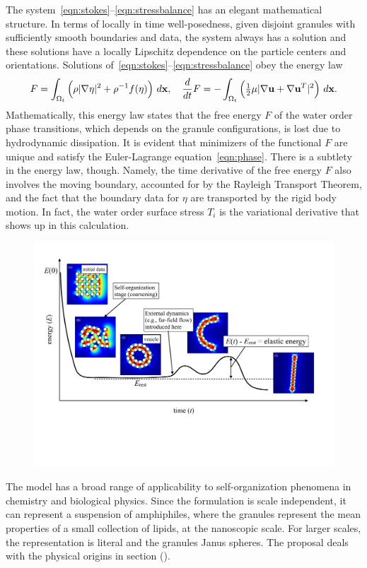 The system~\eqref{eqn:stokes}--\eqref{eqn:stressbalance} has an elegant
mathematical structure. In terms of locally in time well-posedness,
given disjoint granules with sufficiently smooth boundaries and data, the
system always has a solution and these solutions have a locally
Lipschitz dependence on the particle centers and orientations.
Solutions of~\eqref{eqn:stokes}--\eqref{eqn:stressbalance} obey the
energy law
\begin{align}
  F = \int_{\Omega_t}
  \left(\rho |\nabla \eta|^2 + \rho^{-1} f(\eta)\right) \,d\mathbf{x},
  \quad
  \frac{d}{dt}F
  = - \int_{\Omega_t} \left(\tfrac{1}{2}\mu|\nabla \mathbf{u} + \nabla
  \mathbf{u}^T|^2\right) \,d\mathbf{x}.
\end{align}
Mathematically, this energy law states that the free energy $F$ of the
water order phase transitions, which depends on the granule
configurations, is lost due to hydrodynamic dissipation. It is evident
that minimizers of the functional $F$ are unique and satisfy the
Euler-Lagrange equation~\eqref{eqn:phase}. There is a subtlety in the
energy law, though. Namely, the time derivative of the free energy $F$
also involves the moving boundary, accounted for by the Rayleigh
Transport Theorem, and the fact that the boundary data for $\eta$ are
transported by the rigid body motion. In fact, the water order surface
stress $T_i$ is the variational derivative that shows up in this
calculation.

\begin{figure}[t!]
\begin{center}
\includegraphics[width=\textwidth]{figures/Background/coarsening.pdf}
\end{center}
\caption{\label{fig:coarsening}}
\end{figure}
The model has a broad range of applicability to self-organization
phenomena in chemistry and biological physics. Since the formulation is
scale independent, it can represent a suspension of amphiphiles, where
the granules represent the mean properties of a small collection of
lipids, at the nanoscopic scale. For larger scales, the representation
is literal and the granules Janus spheres. The proposal deals with the
physical origins in section (). 

